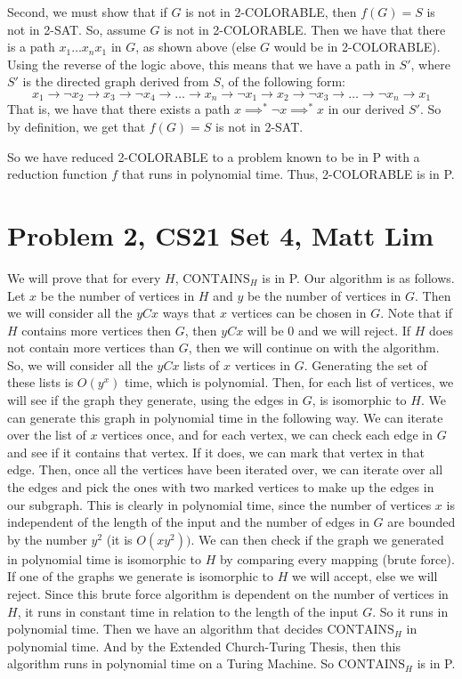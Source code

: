 \documentclass{article}
\begin{document}
Second, we must show that if $G$ is not in 2-COLORABLE, then $f(G) = S$ is
not in 2-SAT. So, assume $G$ is not in 2-COLORABLE. Then we have that there is
a path $x_{1} \dots x_{n} x_{1}$ in $G$, as shown above (else $G$ would
be in 2-COLORABLE). Using the reverse of
the logic above, this means that we have a path in $S'$, where $S'$
is the directed graph derived from $S$, of the following form:
\[ x_{1} \rightarrow \neg x_{2} \rightarrow x_{3} \rightarrow \neg x_{4}
\rightarrow \dots \rightarrow x_{n} \rightarrow \neg x_{1} \rightarrow
x_{2} \rightarrow \neg x_{3} \rightarrow \dots \rightarrow \neg x_{n}
\rightarrow x_{1} \]
That is, we have that there exists a path $x \implies^{*} \neg x \implies^{*}
x$ in our derived $S'$. So by definition, we get that $f(G) = S$ is not in 2-SAT.

So we have reduced 2-COLORABLE to a problem known to be in P with a reduction
function $f$ that runs in polynomial time. Thus, 2-COLORABLE is in P.
\newpage

\section*{Problem 2, CS21 Set 4, Matt Lim}
We will prove that for every $H$, $\text{CONTAINS}_{H}$ is in P. Our algorithm
is as follows. Let $x$ be the number of vertices in $H$ and $y$ be the number
of vertices in $G$. Then we will consider all the $yCx$ ways that $x$ vertices
can be chosen in $G$. Note that if $H$ contains more vertices then $G$, then
$yCx$ will be $0$ and we will reject. If $H$ does not contain more vertices
than $G$, then we will continue on with the algorithm. So, we will consider
all the $yCx$ lists of $x$ vertices in $G$. Generating the set of these lists is
$O(y^{x})$ time, which is polynomial.
Then, for each list of vertices, we will see if the graph they
generate, using the edges in $G$, is isomorphic to $H$. We can generate
this graph in polynomial time in the following way. We can iterate over
the list of $x$ vertices once, and for each vertex, we can check each edge in
$G$ and see if it contains that vertex. If it does, we can mark that vertex
in that edge. Then, once all the vertices have been iterated over, we can
iterate over all the edges and pick the ones with two marked vertices to make
up the edges in our subgraph. This is clearly in polynomial time, since the
number of vertices $x$ is independent of the length of the input and the number
of edges in $G$ are bounded by the number $y^{2}$ (it is $O(xy^{2}))$. We can
then check if the graph we generated in polynomial time is isomorphic to $H$
by comparing every mapping (brute force). If one of the graphs
we generate is isomorphic to $H$ we will accept, else we will reject. Since this
brute force algorithm is dependent on the number of vertices in $H$, it runs in
constant
time in relation to the length of the input $G$. So it runs in polynomial time.
Then we have an algorithm that decides $\text{CONTAINS}_{H}$ in polynomial time.
And by the Extended Church-Turing Thesis, then this algorithm runs in polynomial
time on a Turing Machine. So $\text{CONTAINS}_{H}$ is in P.
\newpage
\end{document}
